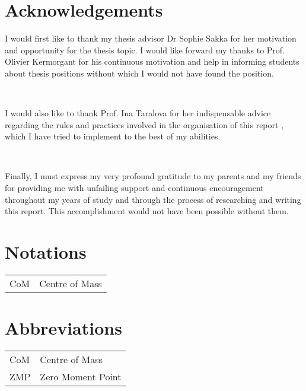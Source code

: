 \documentclass{thesisreport}
\begin{document}
 \section*{Acknowledgements}
 
 I would first like to thank my thesis advisor Dr Sophie Sakka for her motivation and opportunity for the thesis topic.
  I would like forward my thanks to Prof. Olivier Kermorgant for his continuous motivation and help in informing 
  students about thesis positions without which I would not have found the position. 

~

I would also like to thank Prof. Ina Taralova for her indispensable advice regarding the rules and practices involved 
in the organisation of this report , which I have tried to implement to the best of my abilities.

~

Finally, I must express my very profound gratitude to my parents and my friends for providing me with unfailing 
support and continuous encouragement throughout my years of study and through the process of researching and writing 
this report. This accomplishment would not have been possible without them.
 \newpage
 
 
\section*{Notations}
    \begin{tabular}{p{3cm}p{10cm}}
    CoM & Centre of Mass
    \end{tabular}

\newpage

\section*{Abbreviations}

\begin{tabular}{p{3cm}p{10cm}}
CoM & Centre of Mass \\
ZMP & Zero Moment Point \\

\end{tabular}

 \newpage
 
 \tableofcontents

 \listoffigures
 
\listoftables
 

 
 
 
\end{document}

